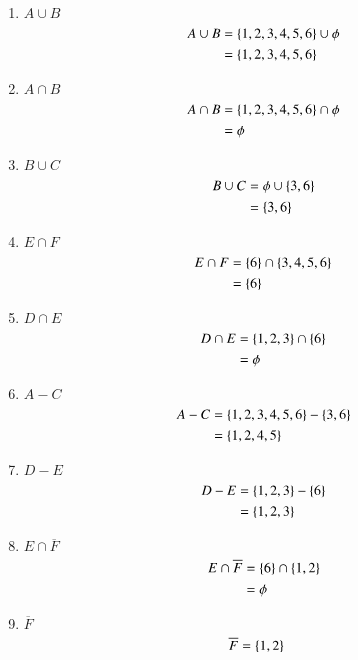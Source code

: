 \documentclass[journal,12pt,twocolumn]{IEEEtran}
\begin{document}
\begin{enumerate}
    \item $A \cup B $
        \begin{align}
            A \cup B &= \left\{1,2,3,4,5,6\right\} \cup \phi\\
            &= \left\{1,2,3,4,5,6\right\}
        \end{align}
    \item $A \cap B $
        \begin{align}
            A \cap B &= \left\{1,2,3,4,5,6\right\} \cap \phi\\
            &= \phi
        \end{align}
    \item $B \cup C $
        \begin{align}
            B \cup C &= \phi \cup \left\{3,6\right\}\\
            &= \left\{3,6\right\}
        \end{align}
    \item $E \cap F $
        \begin{align}
            E \cap F &= \left\{6\right\} \cap \left\{3,4,5,6\right\}\\
            &= \left\{6\right\}
        \end{align}
    \item $D \cap E $
        \begin{align}
            D \cap E &= \left\{1,2,3\right\} \cap \left\{6\right\}\\
            &= \phi
        \end{align}
    \item $A - C $
        \begin{align}
            A - C &= \left\{1,2,3,4,5,6\right\} - \left\{3,6\right\}\\
            &= \left\{1,2,4,5\right\}
        \end{align}
    \item $D - E $
        \begin{align}
            D - E &= \left\{1,2,3\right\} - \left\{6\right\}\\
            &= \left\{1,2,3\right\}
        \end{align}
    \item $E \cap \overline{F}$
        \begin{align}
            E \cap \overline{F} &= \left\{6\right\} \cap \left\{1,2\right\}\\
            &= \phi
        \end{align}
    \item $\overline{F}$
        \begin{align}
            \overline{F} &= \left\{1,2\right\}
        \end{align}
\end{enumerate}
\end{document}
